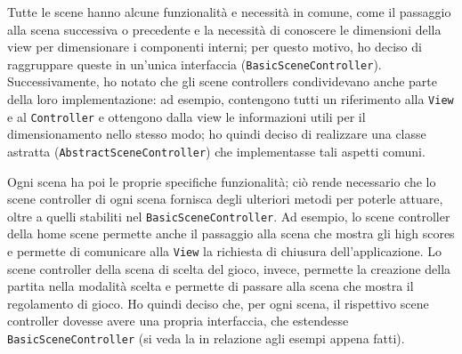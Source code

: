 \documentclass[a4paper,12pt]{report}
\begin{document}
Tutte le scene hanno alcune funzionalità e necessità in comune, come il passaggio alla scena successiva o precedente e la necessità di conoscere le dimensioni della view per dimensionare i componenti interni; per questo motivo, ho deciso di raggruppare queste in un'unica interfaccia (\texttt{BasicSceneController}). Successivamente, ho notato che gli scene controllers condividevano anche parte della loro implementazione: ad esempio, contengono tutti un riferimento alla \texttt{View} e al \texttt{Controller} e ottengono dalla view le informazioni utili per il dimensionamento nello stesso modo; ho quindi deciso di realizzare una classe astratta (\texttt{AbstractSceneController}) che implementasse tali aspetti comuni.

Ogni scena ha poi le proprie specifiche funzionalità; ciò rende necessario che lo scene controller di ogni scena fornisca degli ulteriori metodi per poterle attuare, oltre a quelli stabiliti nel \texttt{BasicSceneController}. Ad esempio, lo scene controller della home scene permette anche il passaggio alla scena che mostra gli high scores e permette di comunicare alla \texttt{View} la richiesta di chiusura dell'applicazione. Lo scene controller della scena di scelta del gioco, invece, permette la creazione della partita nella modalità scelta e permette di passare alla scena che mostra il regolamento di gioco. Ho quindi deciso che, per ogni scena, il rispettivo scene controller dovesse avere una propria interfaccia, che estendesse \texttt{BasicSceneController} (si veda la  in relazione agli esempi appena fatti). 
\end{document}
